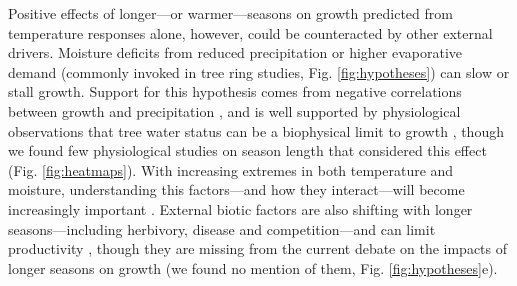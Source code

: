 \documentclass[11pt]{article}
\begin{document}
Positive effects of longer---or warmer---seasons on growth predicted from temperature responses alone, however, could be counteracted by other external drivers. Moisture deficits from reduced precipitation or higher evaporative demand (commonly invoked in tree ring studies, Fig. \ref{fig:hypotheses}) can slow or stall growth. Support for this hypothesis comes from negative correlations between growth and precipitation \citep[or other metrics related to plant access to water in tree ring studies,][]{kolavr2016response,etzold2022number}, and is well supported by physiological observations  that tree water status can be a biophysical limit to growth \citep[i.e., cells cannot expand without sufficient turgor,][]{peters2021turgor,cosgrove2023structure}, though we found few physiological studies on season length that considered this effect (Fig. \ref{fig:heatmaps}). With increasing extremes in both temperature and moisture, understanding this factors---and how they interact---will become increasingly important \citep{charrier2021interaction}. External biotic factors are also shifting with longer seasons---including herbivory, disease and competition\citep{mitton2012mountain,lange2006thresholds,cleland2024effects}---and can limit productivity \citep{sturrock2011climate,la2008forest,senf2017remote}, though they are missing from the current debate on the impacts of longer seasons on growth (we found no mention of them, Fig. \ref{fig:hypotheses}e). 
\end{document}
